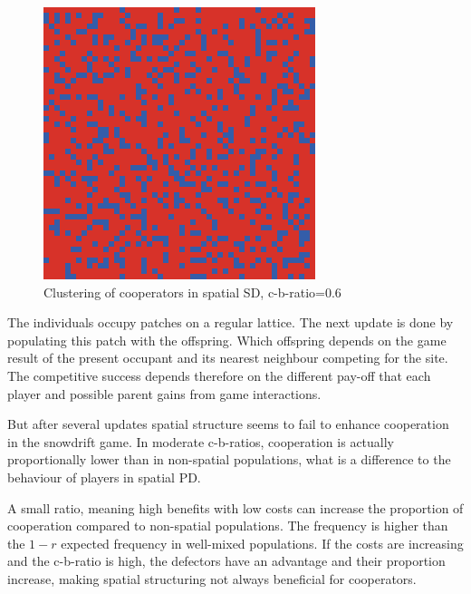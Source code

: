 \documentclass[DIV=calc, paper=a4, fontsize=11pt, twocolumn]{scrartcl}	 %
\begin{document}
\begin{figure}[here]
\centering
\begin{minipage}{.35\textwidth}
  \centering
  \includegraphics[width=1\linewidth]{HDspatial06neu}
 \caption{Clustering of cooperators in spatial SD, c-b-ratio=0.6}
\label{fig:PDspatialcluster}
\end{minipage}%
\end{figure}

The individuals occupy patches on a regular lattice. The next update is done by populating this patch with the offspring. Which offspring depends on the game result of the present occupant and its nearest neighbour competing for the site. The competitive success depends therefore on the different pay-off that each player and possible parent gains from game interactions. 

But after several updates spatial structure seems to fail to enhance cooperation in the snowdrift game. In moderate c-b-ratios, cooperation is actually proportionally lower than in non-spatial populations, what is a difference to the behaviour of players in spatial PD. 

A small ratio, meaning high benefits with low costs can increase the proportion of cooperation compared to non-spatial populations. The frequency is higher than the $1-r$ expected frequency in well-mixed populations. If the costs are increasing and the c-b-ratio is high, the defectors have an advantage and their proportion increase, making spatial structuring not always beneficial for cooperators. 
\end{document}
